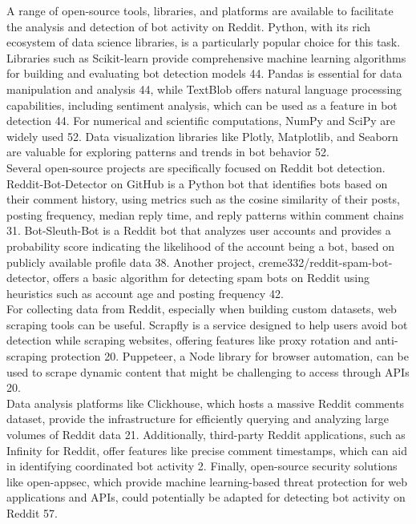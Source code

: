 \documentclass[
  12pt,
  letterpaper,
  DIV=11,
  numbers=noendperiod]{scrartcl}
\begin{document}
A range of open-source tools, libraries, and platforms are available to
facilitate the analysis and detection of bot activity on Reddit. Python,
with its rich ecosystem of data science libraries, is a particularly
popular choice for this task. Libraries such as Scikit-learn provide
comprehensive machine learning algorithms for building and evaluating
bot detection models 44. Pandas is essential for data manipulation and
analysis 44, while TextBlob offers natural language processing
capabilities, including sentiment analysis, which can be used as a
feature in bot detection 44. For numerical and scientific computations,
NumPy and SciPy are widely used 52. Data visualization libraries like
Plotly, Matplotlib, and Seaborn are valuable for exploring patterns and
trends in bot behavior 52.\\
Several open-source projects are specifically focused on Reddit bot
detection. Reddit-Bot-Detector on GitHub is a Python bot that identifies
bots based on their comment history, using metrics such as the cosine
similarity of their posts, posting frequency, median reply time, and
reply patterns within comment chains 31. Bot-Sleuth-Bot is a Reddit bot
that analyzes user accounts and provides a probability score indicating
the likelihood of the account being a bot, based on publicly available
profile data 38. Another project, creme332/reddit-spam-bot-detector,
offers a basic algorithm for detecting spam bots on Reddit using
heuristics such as account age and posting frequency 42.\\
For collecting data from Reddit, especially when building custom
datasets, web scraping tools can be useful. Scrapfly is a service
designed to help users avoid bot detection while scraping websites,
offering features like proxy rotation and anti-scraping protection 20.
Puppeteer, a Node library for browser automation, can be used to scrape
dynamic content that might be challenging to access through APIs 20.\\
Data analysis platforms like Clickhouse, which hosts a massive Reddit
comments dataset, provide the infrastructure for efficiently querying
and analyzing large volumes of Reddit data 21. Additionally, third-party
Reddit applications, such as Infinity for Reddit, offer features like
precise comment timestamps, which can aid in identifying coordinated bot
activity 2. Finally, open-source security solutions like open-appsec,
which provide machine learning-based threat protection for web
applications and APIs, could potentially be adapted for detecting bot
activity on Reddit 57.\\
\end{document}
